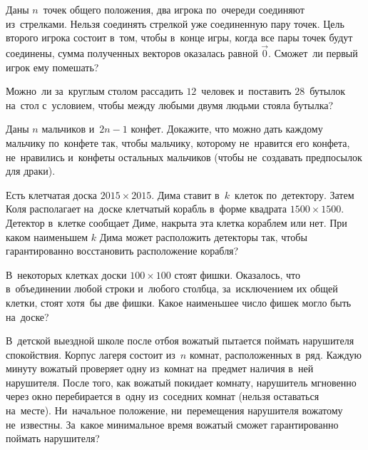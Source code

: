 


\begin{problems}

\item
Даны $n$~точек общего положения, два игрока по~очереди соединяют из~стрелками.
Нельзя соединять стрелкой уже соединенную пару точек.
Цель второго игрока состоит в~том, чтобы в~конце игры, когда все пары точек
будут соединены, сумма полученных векторов оказалась равной $\vec{0}$.
Сможет~ли первый игрок ему помешать?

\item
Можно~ли за~круглым столом рассадить $12$~человек и~поставить $28$~бутылок
на~стол с~условием, чтобы между любыми двумя людьми стояла
бутылка?

\item
Даны $n$ мальчиков и~$2n - 1$ конфет.
Докажите, что можно дать каждому мальчику по~конфете так, чтобы мальчику,
которому не~нравится его конфета, не~нравились и~конфеты остальных мальчиков
(чтобы не~создавать предпосылок для драки).

\item
Есть клетчатая доска $2015 \times 2015$.
Дима ставит в~$k$~клеток по~детектору.
Затем Коля располагает на~доске клетчатый корабль в~форме квадрата
$1500 \times 1500$.
Детектор в~клетке сообщает Диме, накрыта эта клетка кораблем или нет.
При каком наименьшем $k$ Дима может расположить детекторы так, чтобы
гарантированно восстановить расположение корабля?

\item
В~некоторых клетках доски $100 \times 100$ стоят фишки.
Оказалось, что в~объединении любой строки и~любого столбца, за~исключением их
общей клетки, стоят хотя~бы две фишки.
Какое наименьшее число фишек могло быть на~доске?

\item
В~детской выездной школе после отбоя вожатый пытается поймать нарушителя
спокойствия.
Корпус лагеря состоит из~$n$ комнат, расположенных в~ряд.
Каждую минуту вожатый проверяет одну из~комнат на~предмет наличия в~ней
нарушителя.
После того, как вожатый покидает комнату, нарушитель мгновенно через окно
перебирается в~одну из~соседних комнат (нельзя оставаться на~месте).
Ни~начальное положение, ни~перемещения нарушителя вожатому не~известны.
За~какое минимальное время вожатый сможет гарантированно поймать нарушителя?

\end{problems}

